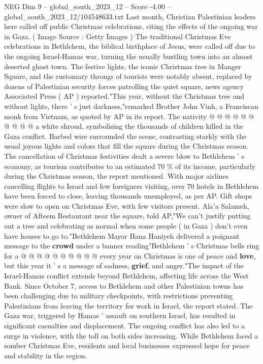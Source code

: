 \begin{textsample}{NEG Dim 9 – global\_south\_2023\_12 – Score -4.00 – global\_south\_2023\_12/104548633.txt}
Last month, Christian Palestinian leaders here called off public Christmas celebrations, citing the effects of the ongoing war in Gaza. ( Image Source : Getty Images ) The traditional Christmas Eve celebrations in Bethlehem, the biblical birthplace of Jesus, were called off due to the ongoing Israel-Hamas war, turning the usually bustling town into an almost deserted ghost town.
The festive lights, the iconic Christmas tree in Manger Square, and the customary throngs of tourists were notably absent, replaced by dozens of Palestinian security forces patrolling the quiet square, news agency Associated Press ( AP ) reported."This year, without the Christmas tree and without lights, there ' s just darkness,"remarked Brother John Vinh, a Franciscan monk from Vietnam, as quoted by AP in its report.
The nativity @ @ @ @ @ @ @ @ @ @ a white shroud, symbolising the thousands of children killed in the Gaza conflict.
Barbed wire surrounded the scene, contrasting starkly with the usual joyous lights and colors that fill the square during the Christmas season.
The cancellation of Christmas festivities dealt a severe blow to Bethlehem ' s economy, as tourism contributes to an estimated 70 \% of its income, particularly during the Christmas season, the report mentioned.
With major airlines cancelling flights to Israel and few foreigners visiting, over 70 hotels in Bethlehem have been forced to close, leaving thousands unemployed, as per AP.
Gift shops were slow to open on Christmas Eve, with few visitors present.
Ala'a Salameh, owner of Afteem Restaurant near the square, told AP,"We can't justify putting out a tree and celebrating as normal when some people ( in Gaza ) don't even have houses to go to."Bethlehem Mayor Hana Haniyeh delivered a poignant message to the \textbf{crowd} under a banner reading"Bethlehem ' s Christmas bells ring for a @ @ @ @ @ @ @ @ @ @ every year on Christmas is one of peace and \textbf{love}, but this year it ' s a message of sadness, \textbf{grief}, and anger."The impact of the Israel-Hamas conflict extends beyond Bethlehem, affecting life across the West Bank.
Since October 7, access to Bethlehem and other Palestinian towns has been challenging due to military checkpoints, with restrictions preventing Palestinians from leaving the territory for work in Israel, the report stated.
The Gaza war, triggered by Hamas ' assault on southern Israel, has resulted in significant casualties and displacement.
The ongoing conflict has also led to a surge in violence, with the toll on both sides increasing.
While Bethlehem faced a somber Christmas Eve, residents and local businesses expressed hope for peace and stability in the region.

\end{textsample}
